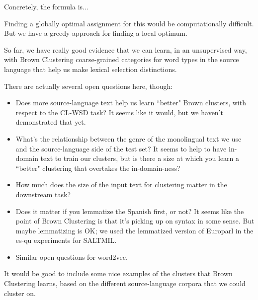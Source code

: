 Concretely, the formula is...


Finding a globally optimal assignment for this would be computationally
difficult. But we have a greedy approach for finding a local optimum.


So far, we have really good evidence that we can learn, in an unsupervised way,
with Brown Clustering coarse-grained categories for word types in the source
language that help us make lexical selection distinctions.

There are actually several open questions here, though:

\begin{itemize}
  \item Does more source-language text help us learn ``better" Brown clusters,
    with respect to the CL-WSD task? It seems like it would, but we haven't
    demonstrated that yet.
  \item What's the relationship between the genre of the monolingual text we
    use and the source-language side of the test set? It seems to help to have
    in-domain text to train our clusters, but is there a size at which you
    learn a ``better" clustering that overtakes the in-domain-ness?
  \item How much does the size of the input text for clustering matter in the
  downstream task?
  \item Does it matter if you lemmatize the Spanish first, or not? It seems
    like the point of Brown Clustering is that it's picking up on syntax in
    some sense. But maybe lemmatizing is OK; we used the lemmatized version of
    Europarl in the es-qu experiments for SALTMIL.
  \item Similar open questions for word2vec.
\end{itemize}

It would be good to include some nice examples of the clusters that Brown
Clustering learns, based on the different source-language corpora that we could
cluster on.


